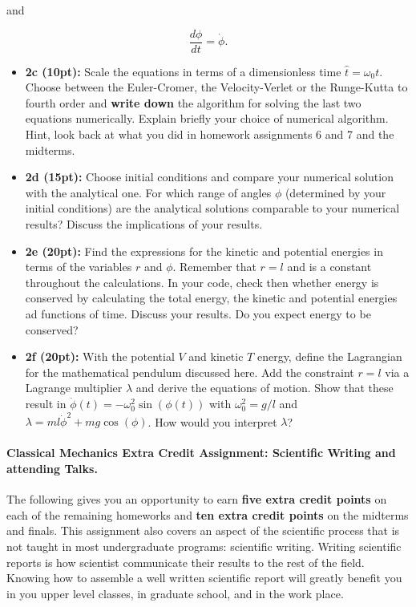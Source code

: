 \documentclass[%
oneside,                 %
final,                   %
10pt]{article}
\begin{document}
and

\[
\frac{d\phi}{dt}=\dot{\phi}.
\]

\begin{itemize}
\item \textbf{2c (10pt):} Scale the equations in terms of a dimensionless time $\hat{t}=\omega_0t$. Choose between the Euler-Cromer, the Velocity-Verlet or the Runge-Kutta to fourth order and \textbf{write down} the algorithm for solving the last two equations numerically. Explain briefly your choice of numerical algorithm. Hint, look back at what you did in homework assignments 6 and 7 and the  midterms.

\item \textbf{2d (15pt):} Choose initial conditions and compare your numerical solution with the analytical one. For which range of angles $\phi$ (determined by your initial conditions) are the analytical solutions comparable to your numerical results? Discuss the implications of your results.

\item \textbf{2e (20pt):} Find the expressions for the kinetic and potential energies in terms of the variables $r$ and $\phi$. Remember that $r=l$ and is a constant throughout the calculations. In your code, check then whether energy is conserved by calculating the total energy, the kinetic and potential energies ad functions of time. Discuss your results. Do you expect energy to be conserved? 

\item \textbf{2f (20pt):} With the potential $V$  and kinetic $T$ energy, define the Lagrangian for the mathematical pendulum discussed here. Add the constraint $r=l$ via a Lagrange multiplier $\lambda$ and derive the equations of motion. Show that these result in  $\ddot{\phi}(t)=-\omega_0^2\sin{(\phi(t))}$ with $\omega_0^2=g/l$ and $\lambda=ml\dot{\phi}^2+mg\cos{(\phi)}$.  How would you interpret $\lambda$? 
\end{itemize}

\noindent
\paragraph{Classical Mechanics Extra Credit Assignment: Scientific Writing and attending Talks.}
The following gives you an opportunity to earn \textbf{five extra credit
points} on each of the remaining homeworks and \textbf{ten extra credit points}
on the midterms and finals.  This assignment also covers an aspect of
the scientific process that is not taught in most undergraduate
programs: scientific writing.  Writing scientific reports is how
scientist communicate their results to the rest of the field.  Knowing
how to assemble a well written scientific report will greatly benefit
you in you upper level classes, in graduate school, and in the work
place.
\end{document}
